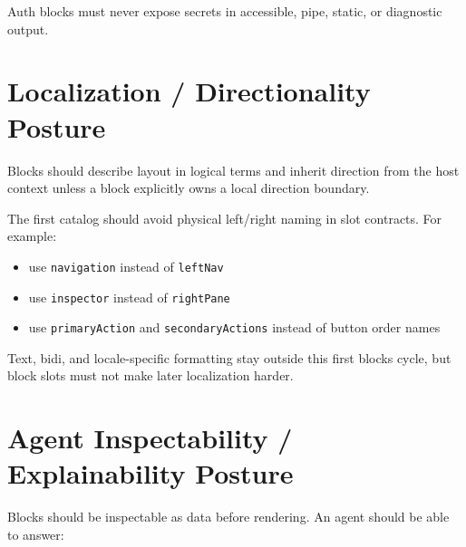 Auth blocks must never expose secrets in accessible, pipe, static, or diagnostic output.

\section{Localization / Directionality Posture}\label{record-128-localization-directionality-posture}

Blocks should describe layout in logical terms and inherit direction from the host context unless a block explicitly owns a local direction boundary.

The first catalog should avoid physical left/right naming in slot contracts. For example:

\begin{itemize}
\tightlist
\item
  use \texttt{n\allowbreak{}a\allowbreak{}v\allowbreak{}i\allowbreak{}g\allowbreak{}a\allowbreak{}t\allowbreak{}i\allowbreak{}o\allowbreak{}n} instead of \texttt{l\allowbreak{}e\allowbreak{}f\allowbreak{}t\allowbreak{}N\allowbreak{}a\allowbreak{}v}
\item
  use \texttt{i\allowbreak{}n\allowbreak{}s\allowbreak{}p\allowbreak{}e\allowbreak{}c\allowbreak{}t\allowbreak{}o\allowbreak{}r} instead of \texttt{r\allowbreak{}i\allowbreak{}g\allowbreak{}h\allowbreak{}t\allowbreak{}P\allowbreak{}a\allowbreak{}n\allowbreak{}e}
\item
  use \texttt{p\allowbreak{}r\allowbreak{}i\allowbreak{}m\allowbreak{}a\allowbreak{}r\allowbreak{}y\allowbreak{}A\allowbreak{}c\allowbreak{}t\allowbreak{}i\allowbreak{}o\allowbreak{}n} and \texttt{s\allowbreak{}e\allowbreak{}c\allowbreak{}o\allowbreak{}n\allowbreak{}d\allowbreak{}a\allowbreak{}r\allowbreak{}y\allowbreak{}A\allowbreak{}c\allowbreak{}t\allowbreak{}i\allowbreak{}o\allowbreak{}n\allowbreak{}s} instead of button order names
\end{itemize}

Text, bidi, and locale-specific formatting stay outside this first blocks cycle, but block slots must not make later localization harder.

\section{Agent Inspectability / Explainability Posture}\label{record-128-agent-inspectability-explainability-posture}

Blocks should be inspectable as data before rendering. An agent should be able to answer:

